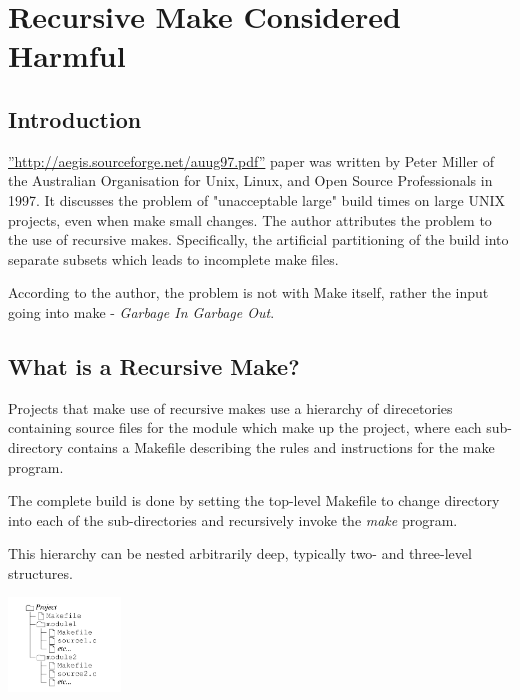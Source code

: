 \usepackage[utf8]{inputenc}
\usepackage[T1]{fontenc}
\usepackage[hidelinks]{hyperref}
\usepackage{graphicx}
\graphicspath{ {figures/}
} 

\chapter{Recursive Make Considered Harmful}

\section{Introduction}

\hyperref[This]{''http://aegis.sourceforge.net/auug97.pdf''} paper was written by Peter Miller of the Australian Organisation for Unix,
Linux, and Open Source Professionals in 1997. It discusses the problem of 
"unacceptable large" build times on large UNIX projects, even when make small 
changes. The author attributes the problem to the use of recursive makes. Specifically,
the artificial partitioning of the build into separate subsets which leads to incomplete
make files.

According to the author, the problem is not with Make itself, rather the input going into
make - \textit{Garbage In Garbage Out}. 


\section{What is a Recursive Make?}

Projects that make use of recursive makes use a hierarchy of direcetories containing 
source files for the module which make up the project, where each sub-directory
contains a Makefile describing the rules and instructions for the make program.

The complete build is done by setting the top-level Makefile to change directory into
each of the sub-directories and recursively invoke the \textit{make} program.

This hierarchy can be nested arbitrarily deep, typically two- and three-level structures.

\includegraphics[width=3cm]{structure}
